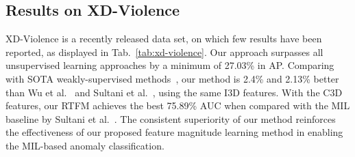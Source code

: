 \documentclass[final]{cvpr}
\begin{document}
\subsection{Results on XD-Violence}

XD-Violence is a recently released data set, on which few results have been reported, as displayed in Tab.~\ref{tab:xd-violence}. Our approach surpasses all unsupervised learning approaches by a minimum of 27.03\% in AP. 
Comparing with SOTA weakly-supervised methods~\cite{Wu2020not,sultani2018real}, our method is 2.4\% and 2.13\% better than Wu et al.~\cite{Wu2020not} and Sultani et al.~\cite{sultani2018real}, using the same I3D features. With the C3D features, our RTFM achieves the best 75.89\% AUC when compared with the MIL baseline by Sultani et al.~\cite{sultani2018real}. The consistent superiority of our method reinforces the effectiveness of our proposed feature magnitude learning method in enabling the MIL-based anomaly classification. 


\begin{table}[htbp]
\centering
{}
\caption{Comparison of AP performance with other SOTA un/weakly-supervised methods on XD-Violence. * indicates we retrain the method in~\cite{sultani2018real} using I3D features. Best result in \textcolor{red}{\textbf{red}} and second best in \textcolor{blue}{\textbf{blue}}.}
\label{tab:xd-violence}
\end{table}
\end{document}
